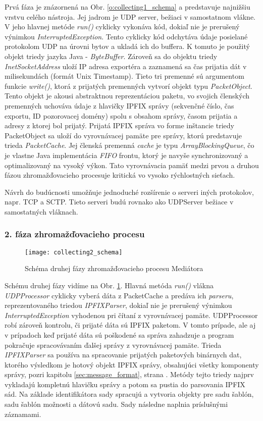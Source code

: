 Prvá fáza je znázornená na Obr. \ref{o:collecting1_schema} a predstavuje najnižšiu vrstvu celého 
nástroja. Jej jadrom je UDP server, bežiaci v samostatnom vlákne. V jeho hlavnej metóde \emph{run()}
cyklicky vykonáva kód, dokiaľ nie je prerušený výnimkou \emph{InterruptedException}.
Tento cyklicky kód odchytáva údaje posielané protokolom UDP na úrovni bytov a ukladá ich do 
buffera. K tomuto je použitý objekt triedy jazyka Java - \emph{ByteBuffer}. Zároveň sa do objektu 
triedy \emph{InetSocketAddress} uloží IP adresa exportéra a zaznamená sa čas prijatia dát v 
milisekundách (formát Unix Timestamp). Tieto tri premenné sú argumentom funkcie \emph{write()}, 
ktorá z prijatých premenných vytvorí objekt typu \emph{PacketObject}. Tento objekt je akousi
abstraktnou reprezentáciou paketu, vo svojich členských premenných uchováva údaje z hlavičky
IPFIX správy (sekvenčné číslo, čas exportu, ID pozorovacej domény) spolu s obsahom správy, časom 
prijatia a adresy z ktorej bol prijatý. 
Prijatá IPFIX správa vo forme inštancie triedy PacketObject 
sa uloží do vyrovnávacej pamäte pre správy, ktorú predstavuje trieda \emph{PacketCache}. Jej členská 
premenná \emph{cache} je typu \emph{ArrayBlockingQueue}, čo je vlastne Java implementácia \emph{FIFO}
frontu, ktorý je navyše synchronizovaný a optimalizovaný na vysoký výkon. Tato vyrovnávacia pamäť 
medzi prvou a druhou fázou zhromažďovacieho procesuje kritická vo vysoko rýchlostných sieťach. 

Návrh do budúcnosti umožňuje jednoduché rozšírenie o serveri iných protokolov, napr. TCP a SCTP. 
Tieto serveri budú rovnako ako UDPServer bežiace v samostatných vláknach.

\subsubsection{2. fáza zhromažďovacieho procesu}

\begin{figure}[ht!]
\centering
\texttt{[image: collecting2\_schema]}
\caption{Schéma druhej fázy zhromažďovacieho procesu Mediátora}\label{o:collecting2_schema}
\end{figure}

Schému druhej fázy vidíme na Obr. \ref{o:collecting2_schema}. Hlavná metóda \emph{run()} vlákna 
\emph{UDPProcessor} cyklicky vyberá dáta z PacketCache a predáva ich \emph{parseru}, reprezentovaného 
triedou \emph{IPFIXParser}, dokiaľ nie je prerušený výnimkou \emph{InterruptedException} vyhodenou pri 
čítaní z vyrovnávacej pamäte.
UDPProcessor robí zároveň kontrolu, či prijaté dáta sú IPFIX paketom. V tomto prípade, ale aj v prípadoch
keď prijaté dáta sú poškodené sa správa zahadzuje a program pokračuje spracovávaním ďalšej správy z 
vyrovnávacej pamäte.
Trieda \emph{IPFIXParser} sa používa na spracovanie prijatých paketových binárnych dat, ktorého 
výsledkom je hotový objekt IPFIX správy, obsahujúci všetky komponenty správy, pozri kapitolu 
\ref{sec:message_format}, strana \pageref{sec:message_format}. Metódy tejto triedy najprv vykladajú 
kompletnú hlavičku správy a potom sa pustia do parsovania IPFIX sád. Na základe identifikátora sady 
spracujú a vytvoria objekty pre sadu šablón, sadu šablón možnosti a dátovú sadu. Sady následne naplnia 
príslušnými záznamami. 

